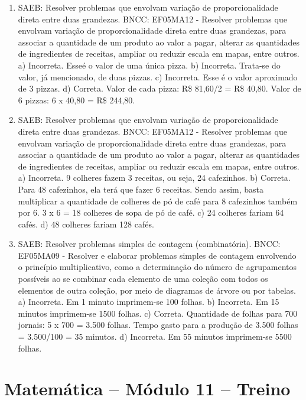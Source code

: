 \begin{enumerate}
\item
SAEB: Resolver problemas que envolvam variação de proporcionalidade direta entre duas grandezas.
BNCC: EF05MA12 - Resolver problemas que envolvam variação de proporcionalidade direta entre
duas grandezas, para associar a quantidade de um produto ao valor a pagar, alterar as
quantidades de ingredientes de receitas, ampliar ou reduzir escala em mapas, entre outros.
a) Incorreta. Esseé o valor de uma única pizza.
b) Incorreta. Trata-se do valor, já mencionado, de duas pizzas.
c) Incorreta. Esse é o valor aproximado de 3 pizzas.
d) Correta. Valor de cada pizza: R\$ 81,60/2 = R\$ 40,80. Valor de 6 pizzas: 6 x 40,80 = R\$ 244,80.

\item
SAEB: Resolver problemas que envolvam variação de proporcionalidade direta entre duas grandezas.
BNCC: EF05MA12 - Resolver problemas que envolvam variação de proporcionalidade direta entre
duas grandezas, para associar a quantidade de um produto ao valor a pagar, alterar as
quantidades de ingredientes de receitas, ampliar ou reduzir escala em mapas, entre outros.
a) Incorreta. 9 colheres fazem 3 receitas, ou seja, 24 cafezinhos.
b) Correta. Para 48 cafezinhos, ela terá que fazer 6 receitas. Sendo assim, basta multiplicar a quantidade de colheres de pó de café para 8 cafezinhos também por
6. 3 x 6 = 18 colheres de sopa de pó de café.
c) 24 colheres fariam 64 cafés.
d) 48 colheres fariam 128 cafés.

\item
SAEB: Resolver problemas simples de contagem (combinatória).
BNCC: EF05MA09 - Resolver e elaborar problemas simples de contagem envolvendo o princípio
multiplicativo, como a determinação do número de agrupamentos possíveis ao se combinar
cada elemento de uma coleção com todos os elementos de outra coleção, por meio de
diagramas de árvore ou por tabelas.
a) Incorreta. Em 1 minuto imprimem-se 100 folhas.
b) Incorreta. Em 15 minutos imprimem-se 1500 folhas.
c) Correta. Quantidade de folhas para 700 jornais: 5 x 700 = 3.500 folhas. Tempo gasto para a produção de 3.500 folhas = 3.500/100 = 35 minutos.
d) Incorreta. Em 55 minutos imprimem-se 5500 folhas.
\end{enumerate}

\section*{Matemática -- Módulo 11 -- Treino}

